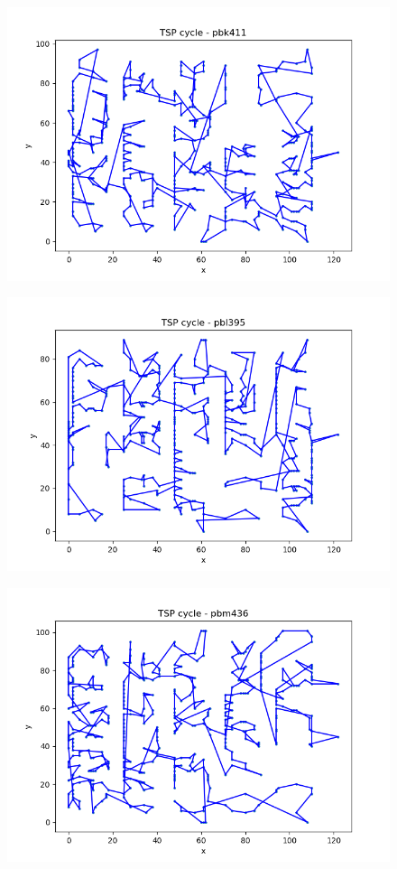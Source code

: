 \documentclass[12pt]{article}
\begin{document}
\begin{figure}[h]
    \centering
    \includegraphics[width=0.8\linewidth]{img/pbk411.png}
    \label{fig:pbk411}
\end{figure}

\begin{figure}[h]
    \centering
    \includegraphics[width=0.8\linewidth]{img/pbl395.png}
    \label{fig:pbl395}
\end{figure}

\begin{figure}[h]
    \centering
    \includegraphics[width=0.8\linewidth]{img/pbm436.png}
    \label{fig:pbm436}
\end{figure}
\end{document}
